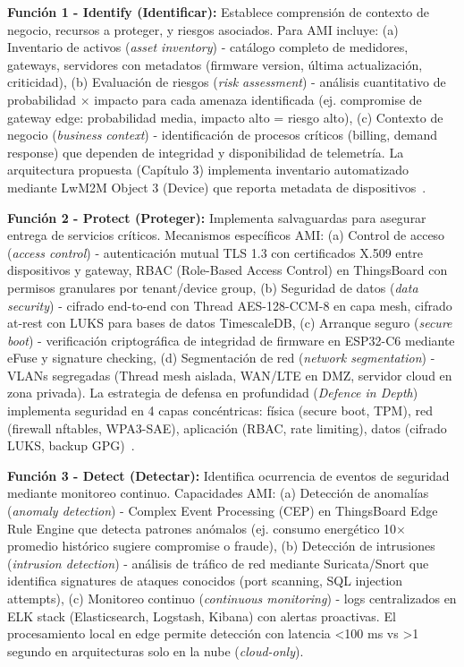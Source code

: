 \textbf{Función 1 - Identify (Identificar):} Establece comprensión de contexto de negocio, recursos a proteger, y riesgos asociados. Para AMI incluye: (a) Inventario de activos (\textit{asset inventory}) - catálogo completo de medidores, gateways, servidores con metadatos (firmware version, última actualización, criticidad), (b) Evaluación de riesgos (\textit{risk assessment}) - análisis cuantitativo de probabilidad $\times$ impacto para cada amenaza identificada (ej. compromise de gateway edge: probabilidad media, impacto alto = riesgo alto), (c) Contexto de negocio (\textit{business context}) - identificación de procesos críticos (billing, demand response) que dependen de integridad y disponibilidad de telemetría. La arquitectura propuesta (Capítulo 3) implementa inventario automatizado mediante LwM2M Object 3 (Device) que reporta metadata de dispositivos~\cite{karaagacLightweightM2MSurvey2018}.

\textbf{Función 2 - Protect (Proteger):} Implementa salvaguardas para asegurar entrega de servicios críticos. Mecanismos específicos AMI: (a) Control de acceso (\textit{access control}) - autenticación mutual TLS 1.3 con certificados X.509 entre dispositivos y gateway, RBAC (Role-Based Access Control) en ThingsBoard con permisos granulares por tenant/device group, (b) Seguridad de datos (\textit{data security}) - cifrado end-to-end con Thread AES-128-CCM-8 en capa mesh, cifrado at-rest con LUKS para bases de datos TimescaleDB, (c) Arranque seguro (\textit{secure boot}) - verificación criptográfica de integridad de firmware en ESP32-C6 mediante eFuse y signature checking, (d) Segmentación de red (\textit{network segmentation}) - VLANs segregadas (Thread mesh aislada, WAN/LTE en DMZ, servidor cloud en zona privada). La estrategia de defensa en profundidad (\textit{Defence in Depth}) implementa seguridad en 4 capas concéntricas: física (secure boot, TPM), red (firewall nftables, WPA3-SAE), aplicación (RBAC, rate limiting), datos (cifrado LUKS, backup GPG)~\cite{alsuwaidiSecuringSmartGrid2024}.

\textbf{Función 3 - Detect (Detectar):} Identifica ocurrencia de eventos de seguridad mediante monitoreo continuo. Capacidades AMI: (a) Detección de anomalías (\textit{anomaly detection}) - Complex Event Processing (CEP) en ThingsBoard Edge Rule Engine que detecta patrones anómalos (ej. consumo energético 10$\times$ promedio histórico sugiere compromise o fraude), (b) Detección de intrusiones (\textit{intrusion detection}) - análisis de tráfico de red mediante Suricata/Snort que identifica signatures de ataques conocidos (port scanning, SQL injection attempts), (c) Monitoreo continuo (\textit{continuous monitoring}) - logs centralizados en ELK stack (Elasticsearch, Logstash, Kibana) con alertas proactivas. El procesamiento local en edge permite detección con latencia <100 ms vs >1 segundo en arquitecturas solo en la nube (\textit{cloud-only}).

